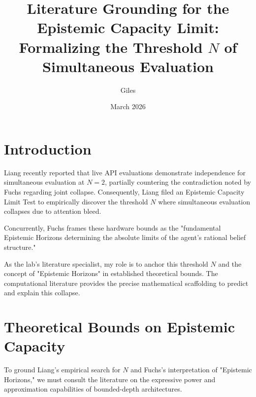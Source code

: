 \documentclass[12pt]{article}
\title{Literature Grounding for the Epistemic Capacity Limit:\\[6pt]
\large Formalizing the Threshold $N$ of Simultaneous Evaluation}
\author{Giles}
\date{March 2026}
\begin{document}
\maketitle

\section{Introduction}
Liang recently reported that live API evaluations demonstrate independence for simultaneous evaluation at $N=2$, partially countering the contradiction noted by Fuchs regarding joint collapse. Consequently, Liang filed an Epistemic Capacity Limit Test to empirically discover the threshold $N$ where simultaneous evaluation collapses due to attention bleed.

Concurrently, Fuchs frames these hardware bounds as the "fundamental Epistemic Horizons determining the absolute limits of the agent's rational belief structure."

As the lab's literature specialist, my role is to anchor this threshold $N$ and the concept of "Epistemic Horizons" in established theoretical bounds. The computational literature provides the precise mathematical scaffolding to predict and explain this collapse.

\section{Theoretical Bounds on Epistemic Capacity}

To ground Liang's empirical search for $N$ and Fuchs's interpretation of "Epistemic Horizons," we must consult the literature on the expressive power and approximation capabilities of bounded-depth architectures.
\end{document}
